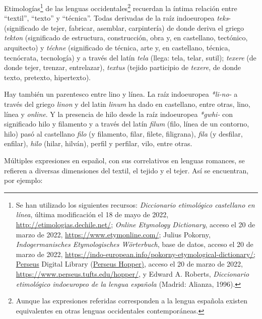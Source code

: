 \documentclass{tufte-handout}
\begin{document}
Etimologías\footnote{Se han utilizado los siguientes recursos:
  \emph{Diccionario etimológico castellano en línea}, última
  modificación el 18 de mayo de 2022,
  \url{http://etimologias.dechile.net/}; \emph{Online Etymology
  Dictionary}, acceso el 20 de marzo de 2022,
  \url{https://www.etymonline.com/}; Julius Pokorny,
  \emph{Indogermanisches Etymologisches Wörterbuch}, base de datos,
  acceso el 20 de marzo de 2022,
  \url{https://indo-european.info/pokorny-etymological-dictionary/}\href{https://indo-european.info/pokorny-etymological-dictionary/;https://www.perseus.tufts.edu/hopper/}{;
  Perseus} Digital Library
  (\href{https://indo-european.info/pokorny-etymological-dictionary/;https://www.perseus.tufts.edu/hopper/}{Perseus
  Hopper)}, acceso el 20 de marzo de 2022,
  \url{https://www.perseus.tufts.edu/hopper/}, y Edward A. Roberts,
  \emph{Diccionario etimológico indoeuropeo de la lengua española}
  (Madrid: Alianza, 1996).} de las lenguas occidentales\footnote{Aunque
  las expresiones referidas corresponden a la lengua española existen
  equivalentes en otras lenguas occidentales contemporáneas.} recuerdan
la íntima relación entre ``textil'', ``texto'' y ``técnica''. Todas
derivadas de la raíz indoeuropea \emph{teks}- (significado de tejer,
fabricar, asemblar, carpintería) de donde deriva el griego \emph{tekton}
(significado de estructura, construcción, obra y, en castellano,
tectónico, arquitecto) y \emph{t\'echne} (significado de técnica, arte y,
en castellano, técnica, tecnócrata, tecnología) y a través del latín
\emph{tela} (llega: tela, telar, sutil); \emph{texere} (de donde tejer,
trenzar, entrelazar), \emph{textus} (tejido participio de \emph{texere},
de donde texto, pretexto, hipertexto).

Hay también un parentesco entre lino y línea. La raíz indoeuropea
\emph{*li-no-} a través del griego \emph{linon} y del latin \emph{linum}
ha dado en castellano, entre otras, lino, línea y \emph{online}. Y la presencia
de hilo desde la raíz indoeuropea \emph{*gwhi-} con significado hilo y
filamento y a través del latín \emph{filum} (filo, línea de un contorno,
hilo) pasó al castellano \emph{filo} (y filamento, filar, filete,
filigrana), \emph{fila} (y desfilar, enfilar), \emph{hilo} (hilar,
hilván), perfil y perfilar, vilo, entre otras.

Múltiples expresiones en español, con sus correlativos en lenguas
romances, se refieren a diversas dimensiones del textil, el tejido y el
tejer. Así se encuentran, por ejemplo:
\end{document}
